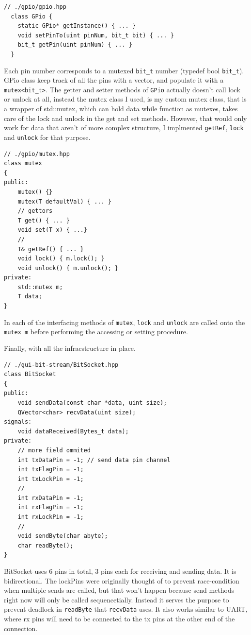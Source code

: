 \documentclass[11pt]{article}
\begin{document}
\begin{multicols*}{2}
\begin{lstlisting}[caption={GPio class illustration}]
  // ./gpio/gpio.hpp
  class GPio {
    static GPio* getInstance() { ... }
    void setPinTo(uint pinNum, bit_t bit) { ... }
    bit_t getPin(uint pinNum) { ... }
  }
\end{lstlisting}

Each pin number corresponds to a mutexed \verb|bit_t| number (typedef bool \verb|bit_t|). GPio class keep track of all the pins with a vector, and populate it with a \verb|mutex<bit_t>|. The getter and setter methods of \verb|GPio| actually doesn't call lock or unlock at all, instead the mutex class I used, is my custom mutex class, that is a wrapper of std::mutex, which can hold data while function as mutexes, takes care of the lock and unlock in the get and set methods. However, that would only work for data that aren't of more complex structure, I implmented \verb|getRef|, \verb|lock| and \verb|unlock| for that purpose.

\begin{lstlisting}[caption={my mutex class illustration}]
// ./gpio/mutex.hpp
class mutex
{
public:
    mutex() {}
    mutex(T defaultVal) { ... }
    // gettors
    T get() { ... }
    void set(T x) { ...}
    //
    T& getRef() { ... }
    void lock() { m.lock(); }
    void unlock() { m.unlock(); }
private:
    std::mutex m;
    T data;
}
\end{lstlisting}

In each of the interfacing methods of \verb|mutex|, \verb|lock| and \verb|unlock| are called onto the \verb|mutex m| before performing the accessing or setting procedure.

Finally, with all the infracstructure in place.

\begin{lstlisting}[caption={BitSocket class illustration}]
// ./gui-bit-stream/BitSocket.hpp
class BitSocket
{
public:
    void sendData(const char *data, uint size);
    QVector<char> recvData(uint size);
signals:
    void dataReceived(Bytes_t data);
private:
    // more field ommited
    int txDataPin = -1; // send data pin channel
    int txFlagPin = -1;
    int txLockPin = -1;
    //
    int rxDataPin = -1;
    int rxFlagPin = -1;
    int rxLockPin = -1;
    //
    void sendByte(char abyte);
    char readByte();
}
\end{lstlisting}

BitSocket uses 6 pins in total, 3 pins each for receiving and sending data. It is bidirectional. The lockPins were originally thought of to prevent race-condition when multiple sends are called, but that won't happen because send methods right now will only be called sequencetially. Instead it serves the purpose to prevent deadlock in \verb|readByte| that \verb|recvData| uses. It also works similar to UART, where rx pins will need to be connected to the tx pins at the other end of the connection.


\end{multicols*}
\end{document}
